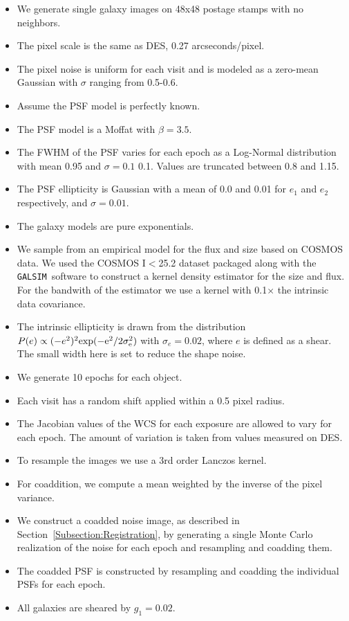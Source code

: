 \documentclass[fleqn,useAMS,usenatbib]{mnras}
\newcommand{\galsim}{\texttt{GALSIM}}
\begin{document}
\begin{itemize}
\item We generate single galaxy images on 48x48 postage stamps with no 
neighbors.
\item The pixel scale is the same as DES, 0.27 arcseconds/pixel.
\item The pixel noise is uniform for each visit and is modeled as a zero-mean 
Gaussian with $\sigma$ ranging from 0.5-0.6.
\item Assume the PSF model is perfectly known.
\item The PSF model is a Moffat with $\beta=3.5$.
\item The \textsf{FWHM} of the PSF varies for each epoch as a Log-Normal 
distribution with mean 0.95 and $\sigma=0.1$ 0.1.  Values are truncated between 
0.8 and 1.15.
\item The PSF ellipticity is Gaussian with a mean of 0.0 and 0.01 for $e_1$ and 
$e_2$ respectively, and $\sigma=0.01$.
\item The galaxy models are pure exponentials.  
\item We sample from an empirical model for the flux and size based on 
\textsf{COSMOS} data.  We used the \textsf{COSMOS} I$<$25.2 dataset packaged 
along with the \galsim\ software to construct a kernel density estimator for the 
size and flux.  For the bandwith of the estimator we use a kernel with 0.1$\times$ 
the intrinsic data covariance.
\item The intrinsic ellipticity is drawn from the distribution $P(e) \propto 
  (-e^2)^2 \rm{exp}(-e^2/2\sigma_e^2)$ with $\sigma_e=0.02$, where $e$ is defined
  as a shear.  The small width here is set to reduce the shape noise.
\item We generate 10 epochs for each object.  
\item Each visit has a random shift applied within a 0.5 pixel radius.
\item The Jacobian values of the WCS for each exposure are allowed to vary for 
each epoch.  The amount of variation is taken from values measured on DES.
\item To resample the images we use a 3rd order Lanczos kernel.
\item For coaddition, we compute a mean weighted by the inverse of the pixel 
variance.
\item We construct a coadded noise image, as described in 
Section~\ref{Subsection:Registration}, by generating a single Monte Carlo realization 
of the noise for each epoch and resampling and coadding them.
\item The coadded PSF is constructed by resampling and coadding the individual 
PSFs for each epoch.
\item All galaxies are sheared by $g_1=0.02$.
\end{itemize}
\end{document}
